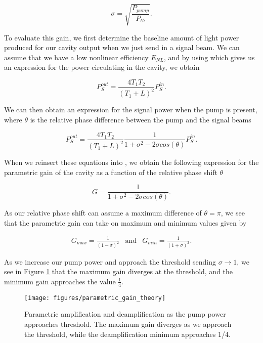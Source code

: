 \begin{equation}
  \label{eq:pump_param}
  \sigma = \sqrt{\frac{P_{pump}}{P_{th}} }.
\end{equation}

\noindent
To evaluate this gain, we first determine the baseline amount of light power
produced for our cavity output when we just send in a signal beam.  We can
assume that we have a low nonlinear efficiency $E_{NL}$, and by using
 which gives us an expression for the power circulating in the cavity, we obtain

\begin{equation}
  \label{eq:p_sig}
  P^{out}_S = \frac{4T_1T_2}{(T_1+L)^2} P^{in}_S.
\end{equation}

\noindent
We can then obtain an expression for the signal power when the pump is present, where $\theta$ is the relative phase difference between the pump and the signal beams \cite{ortalo}

\begin{equation}
  \label{eq:p_pump_sig}
  P^{out}_S = \frac{4T_1T_2}{(T_1+L)^2} \frac{1}{1+\sigma^2-2\sigma cos(\theta)} P^{in}_S.
\end{equation}

\noindent
When we reinsert these equations into , we obtain the following expression for the parametric gain of the cavity as a function of the relative phase shift $\theta$

\begin{equation}
  \label{eq:gain_final}
  G = \frac{1}{1+\sigma^2-2\sigma cos(\theta)} .
\end{equation}

\noindent
As our relative phase shift can assume a maximum difference of $\theta = \pi$, we see that the parametric gain can take on maximum and minimum values given by 

\begin{eqnarray}
  \label{eq:pg_max_min}
  G_{max} = \frac{1}{(1-\sigma)^2} & \text{and} & G_{min} = \frac{1}{(1+\sigma)^2}.
\end{eqnarray}

\noindent
As we increase our pump power and approach the threshold sending $\sigma \rightarrow 1$, we see in Figure \ref{fig:pg_theory} that the maximum gain diverges at the threshold, and the minimum gain approaches the value $\frac{1}{4}$.

\begin{figure}[!ht] 
 \centering 
 \texttt{[image: figures/parametric\_gain\_theory]} 
 \caption[Parametric gain vs. pump parameter]{Parametric amplification and deamplification as the pump power approaches threshold.  The maximum gain diverges as we approach the threshold, while the deamplification minimum approaches 1/4.} 
 \label{fig:pg_theory} 
\end{figure}


